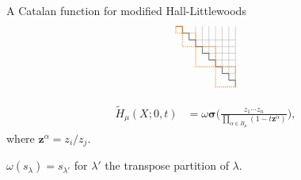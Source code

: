 \documentclass[dvipsnames]{beamer}
\newcommand{\zz}{{\boldsymbol z}}
\newcommand{\sigmabold}{\boldsymbol \sigma}
\newcommand{\Htild}{\tilde{H}}
\theoremstyle{definition}
\begin{document}
\begin{frame}{A Catalan function for modified Hall-Littlewoods}
\begin{align*}
\begin{tikzpicture}[scale=.213]
\draw[thin, black!31] (3,-3) -- (10,-3);
\draw[thin, black!31] (4,-3) -- (4,-1);
\draw[thin, black!31] (4,-4) -- (10,-4);
\draw[thin, black!31] (5,-4) -- (5,-1);
\draw[thin, black!31] (5,-5) -- (10,-5);
\draw[thin, black!31] (6,-5) -- (6,-1);
\draw[thin, black!31] (6,-6) -- (10,-6);
\draw[thin, black!31] (7,-6) -- (7,-1);
\draw[thin, black!31] (7,-7) -- (10,-7);
\draw[thin, black!31] (8,-7) -- (8,-1);
\draw[thin, black!31] (8,-8) -- (10,-8);
\draw[thin, black!31] (9,-8) -- (9,-1);
\draw[thin, black!31] (9,-9) -- (10,-9);
\draw[thin, black!31] (10,-9) -- (10,-1);
 \draw[thin] (1,-1) -- (2,-1);
\draw[thin] (2,-1) -- (2,-2);
\draw[thin] (2,-2) -- (3,-2);
\draw[thin] (3,-2) -- (3,-3);
\draw[thin] (3,-3) -- (4,-3);
\draw[thin] (4,-3) -- (4,-4);
\draw[thin] (4,-4) -- (5,-4);
\draw[thin] (5,-4) -- (5,-5);
\draw[thin] (5,-5) -- (6,-5);
\draw[thin] (6,-5) -- (6,-6);
\draw[thin] (6,-6) -- (7,-6);
\draw[thin] (7,-6) -- (7,-7);
\draw[thin] (7,-7) -- (8,-7);
\draw[thin] (8,-7) -- (8,-8);
\draw[thin] (8,-8) -- (9,-8);
\draw[thin] (9,-8) -- (9,-9);
\draw[thin] (9,-9) -- (10,-9);
\draw[thin] (10,-9) -- (10,-10);
\draw[thick, densely dotted, orange] (1,-1) rectangle (2,-2);
\draw[thick, densely dotted, orange] (2,-2) rectangle (4,-4);
\draw[thick, densely dotted, orange] (4,-4) rectangle (7,-7);
\draw[thick, densely dotted, orange] (7,-7) rectangle (10,-10);
\end{tikzpicture}
\end{align*}

\vspace{-2mm}\pause
\begin{theorem}
  \begin{align*}
\Htild_\mu(X;0,t) & = \omega\sigmabold 
\Big( \frac{z_1\cdots z_n}{\prod_{\alpha \in
B_\mu}(1 - t \zz^\alpha)} \Big),
\end{align*}
where \(\zz^\alpha = z_i/z_j\).
\end{theorem}
\(\omega(s_\lambda) = s_{\lambda'}\) for \(\lambda'\) the transpose
partition of \(\lambda\).
\end{frame}
\end{document}
